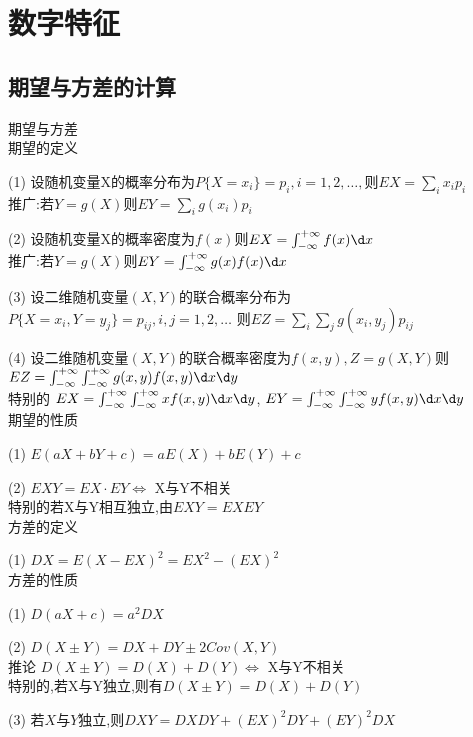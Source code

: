 \documentclass[12pt, a4paper, oneside, UTF8]{ctexbook}
\begin{document}
% 
\else
\fi

\chapter{数字特征}

\section{期望与方差的计算}
\begin{remark}
    期望与方差 \\
    期望的定义
    \item[(1)]设随机变量X的概率分布为$P\{X=x_i\}=p_i,i=1,2,\ldots,$则$EX=\sum_{i}x_ip_i$ \\
    推广:若$Y=g(X)$则$EY=\sum_{i}g(x_i)p_i$ 
    \item[(2)]设随机变量X的概率密度为$f(x)$则$EX=\int_{-\infty}^{+\infty}f(x)\d x$ \\
    推广:若$Y=g(X)$则$EY=\int_{-\infty}^{+\infty}g(x)f(x)\d x$
    \item[(3)]设二维随机变量$(X,Y)$的联合概率分布为$P\{X=x_i,Y=y_j\}=p_{ij},i,j=1,2,\ldots$
    则$EZ=\sum_{i}\sum_{j}g(x_i,y_j)p_{ij}$
    \item[(4)]设二维随机变量$(X,Y)$的联合概率密度为$f(x,y),Z=g(X,Y)$则 \\
    $EZ=\int_{-\infty}^{+\infty}\int_{-\infty}^{+\infty}g(x,y)f(x,y)\d x\d y$ \\
    特别的 $EX=\int_{-\infty}^{+\infty}\int_{-\infty}^{+\infty}xf(x,y)\d x \d y$, 
    $EY=\int_{-\infty}^{+\infty}\int_{-\infty}^{+\infty}yf(x,y)\d x\d y$ \\
    期望的性质
    \item[(1)] $E(aX+bY+c)=aE(X)+bE(Y)+c$ 
    \item[(2)] $EXY=EX\cdot EY \iff $ X与Y不相关 \\
    特别的若X与Y相互独立,由$EXY=EXEY$ \\
    方差的定义
    \item[(1)] $DX=E(X-EX)^2=EX^2-(EX)^2$ \\
    方差的性质
    \item[(1)] $D(aX+c)=a^2DX$ 
    \item[(2)] $D(X\pm Y)=DX+DY\pm 2Cov(X,Y)$ \\
    推论 $D(X\pm Y)=D(X)+D(Y)\iff$ X与Y不相关 \\
    特别的,若X与Y独立,则有$D(X\pm Y)=D(X)+D(Y)$
    \item[(3)]若$X$与$Y$独立,则$DXY=DXDY+(EX)^2DY+(EY)^2DX$
\end{remark}
\end{document}
